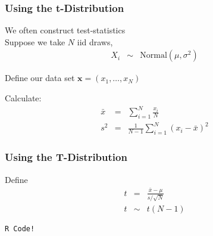 \documentclass{beamer}
\numberwithin{equation}{section}
\begin{document}
\begin{frame}
\frametitle{Using the t-Distribution}

We often construct \alert{test-statistics}\\
Suppose we take $N$ iid draws, 
\begin{eqnarray}
X_{i} & \sim & \text{Normal}(\mu, \sigma^2) \nonumber 
\end{eqnarray}

Define our data set $\boldsymbol{x} = (x_{1}, \hdots, x_{N})$

Calculate:
\begin{eqnarray}
 \bar{x} & = &  \sum_{i=1}^{N} \frac{x_{i}}{N} \nonumber \\
 s^2 & = & \frac{1}{N-1} \sum_{i=1}^{N} (x_{i} - \bar{x})^2 \nonumber 
\end{eqnarray}

\end{frame}


\begin{frame}
\frametitle{Using the T-Distribution}

Define 
\begin{eqnarray}
t & = & \frac{\bar{x} - \mu}{s/\sqrt{N}} \nonumber \\
t & \sim & t(N-1) \nonumber 
\end{eqnarray}

{\tt R Code!}

\end{frame}
\end{document}
